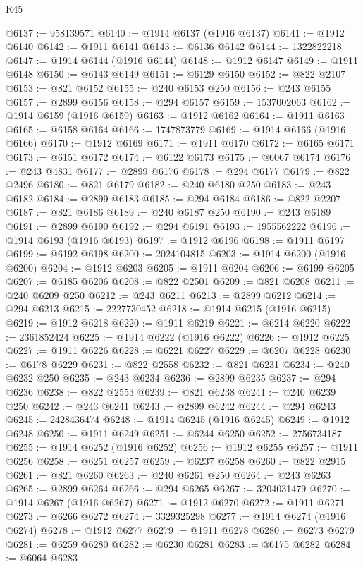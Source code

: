 \begin{lexlean}{R45}
\begin{coremodule}
{@6137 := 958139571
@6140 := @1914 @6137 (@1916 @6137)
@6141 := @1912 @6140
@6142 := @1911 @6141
@6143 := @6136 @6142
@6144 := 1322822218
@6147 := @1914 @6144 (@1916 @6144)
@6148 := @1912 @6147
@6149 := @1911 @6148
@6150 := @6143 @6149
@6151 := @6129 @6150
@6152 := @822 @2107
@6153 := @821 @6152
@6155 := @240 @6153 @250
@6156 := @243 @6155
@6157 := @2899 @6156
@6158 := @294 @6157
@6159 := 1537002063
@6162 := @1914 @6159 (@1916 @6159)
@6163 := @1912 @6162
@6164 := @1911 @6163
@6165 := @6158 @6164
@6166 := 1747873779
@6169 := @1914 @6166 (@1916 @6166)
@6170 := @1912 @6169
@6171 := @1911 @6170
@6172 := @6165 @6171
@6173 := @6151 @6172
@6174 := @6122 @6173
@6175 := @6067 @6174
@6176 := @243 @4831
@6177 := @2899 @6176
@6178 := @294 @6177
@6179 := @822 @2496
@6180 := @821 @6179
@6182 := @240 @6180 @250
@6183 := @243 @6182
@6184 := @2899 @6183
@6185 := @294 @6184
@6186 := @822 @2207
@6187 := @821 @6186
@6189 := @240 @6187 @250
@6190 := @243 @6189
@6191 := @2899 @6190
@6192 := @294 @6191
@6193 := 1955562222
@6196 := @1914 @6193 (@1916 @6193)
@6197 := @1912 @6196
@6198 := @1911 @6197
@6199 := @6192 @6198
@6200 := 2024104815
@6203 := @1914 @6200 (@1916 @6200)
@6204 := @1912 @6203
@6205 := @1911 @6204
@6206 := @6199 @6205
@6207 := @6185 @6206
@6208 := @822 @2501
@6209 := @821 @6208
@6211 := @240 @6209 @250
@6212 := @243 @6211
@6213 := @2899 @6212
@6214 := @294 @6213
@6215 := 2227730452
@6218 := @1914 @6215 (@1916 @6215)
@6219 := @1912 @6218
@6220 := @1911 @6219
@6221 := @6214 @6220
@6222 := 2361852424
@6225 := @1914 @6222 (@1916 @6222)
@6226 := @1912 @6225
@6227 := @1911 @6226
@6228 := @6221 @6227
@6229 := @6207 @6228
@6230 := @6178 @6229
@6231 := @822 @2558
@6232 := @821 @6231
@6234 := @240 @6232 @250
@6235 := @243 @6234
@6236 := @2899 @6235
@6237 := @294 @6236
@6238 := @822 @2553
@6239 := @821 @6238
@6241 := @240 @6239 @250
@6242 := @243 @6241
@6243 := @2899 @6242
@6244 := @294 @6243
@6245 := 2428436474
@6248 := @1914 @6245 (@1916 @6245)
@6249 := @1912 @6248
@6250 := @1911 @6249
@6251 := @6244 @6250
@6252 := 2756734187
@6255 := @1914 @6252 (@1916 @6252)
@6256 := @1912 @6255
@6257 := @1911 @6256
@6258 := @6251 @6257
@6259 := @6237 @6258
@6260 := @822 @2915
@6261 := @821 @6260
@6263 := @240 @6261 @250
@6264 := @243 @6263
@6265 := @2899 @6264
@6266 := @294 @6265
@6267 := 3204031479
@6270 := @1914 @6267 (@1916 @6267)
@6271 := @1912 @6270
@6272 := @1911 @6271
@6273 := @6266 @6272
@6274 := 3329325298
@6277 := @1914 @6274 (@1916 @6274)
@6278 := @1912 @6277
@6279 := @1911 @6278
@6280 := @6273 @6279
@6281 := @6259 @6280
@6282 := @6230 @6281
@6283 := @6175 @6282
@6284 := @6064 @6283
}
\end{coremodule}
\end{lexlean}
